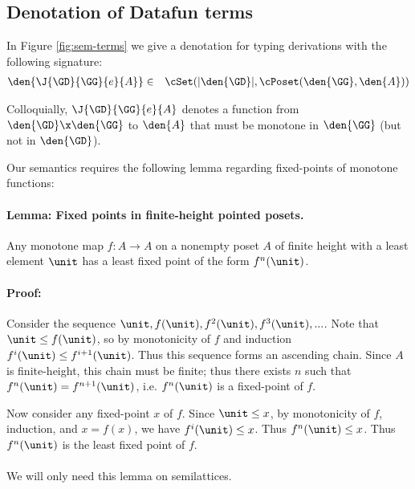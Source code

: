 
\subsection{Denotation of Datafun terms}

In Figure \ref{fig:sem-terms} we give a denotation for typing derivations with
the following signature:
\begin{eqnarray*}
  \den{\J{\GD}{\GG}{e}{A}} &\in&
  \cSet(\U{\den{\GD}}, \cPoset(\den{\GG}, \den{A}))
\end{eqnarray*}

Colloquially, $\J{\GD}{\GG}{e}{A}$ denotes a function from $\den{\GD} \x
\den{\GG}$ to $\den{A}$ that must be monotone in $\den{\GG}$ (but not in
$\den{\GD}$).

Our semantics requires the following lemma regarding fixed-points of monotone
functions:


\paragraph{Lemma: Fixed points in finite-height pointed posets.}
Any monotone map $f : A \to A$ on a nonempty poset $A$ of finite height with a
least element $\unit$ has a least fixed point of the form $f^n(\unit)$.

\paragraph{Proof:}
Consider the sequence $\unit, f(\unit), f^2(\unit), f^3(\unit), ...$. Note that
$\unit \le f(\unit)$, so by monotonicity of $f$ and induction $f^i(\unit) \le
f^{i+1}(\unit)$. Thus this sequence forms an ascending chain. Since $A$ is
finite-height, this chain must be finite; thus there exists $n$ such that
$f^n(\unit) = f^{n+1}(\unit)$, i.e. $f^n(\unit)$ is a fixed-point of $f$.

Now consider any fixed-point $x$ of $f$. Since $\unit \le x$, by monotonicity of
$f$, induction, and $x = f(x)$, we have $f^i(\unit) \le x$. Thus $f^n(\unit) \le
x$. Thus $f^n(\unit)$ is the least fixed point of $f$.

\paragraph{}
We will only need this lemma on semilattices.

